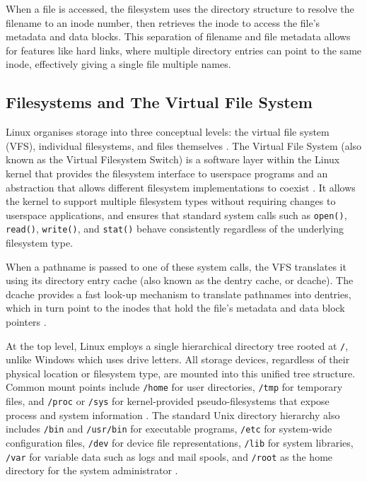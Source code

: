 When a file is accessed, the filesystem uses the directory structure to resolve the filename to an inode number, then retrieves the inode to access the file's metadata and data blocks. This separation of filename and file metadata allows for features like hard links, where multiple directory entries can point to the same inode, effectively giving a single file multiple names.

\subsection{Filesystems and The Virtual File System}
\label{VFS}

Linux organises storage into three conceptual levels: the virtual file system (VFS), individual filesystems, and files themselves \parencite{KernelVFS,GFGOSFileSystems}. The Virtual File System (also known as the Virtual Filesystem Switch) is a software layer within the Linux kernel that provides the filesystem interface to userspace programs and an abstraction that allows different filesystem implementations to coexist \parencite{KernelVFS}. It allows the kernel to support multiple filesystem types without requiring changes to userspace applications, and ensures that standard system calls such as \texttt{open()}, \texttt{read()}, \texttt{write()}, and \texttt{stat()} behave consistently regardless of the underlying filesystem type.

When a pathname is passed to one of these system calls, the VFS translates it using its directory entry cache (also known as the dentry cache, or dcache). The dcache provides a fast look-up mechanism to translate pathnames into dentries, which in turn point to the inodes that hold the file's metadata and data block pointers \parencite{KernelVFS}.

At the top level, Linux employs a single hierarchical directory tree\parencite{GFGUnixFileSystem} rooted at \texttt{/}, unlike Windows which uses drive letters. All storage devices, regardless of their physical location or filesystem type, are mounted into this unified tree structure. Common mount points include \texttt{/home} for user directories, \texttt{/tmp} for temporary files, and \texttt{/proc} or \texttt{/sys} for kernel-provided pseudo-filesystems that expose process and system information \parencite{KernelProc}. The standard Unix directory hierarchy also includes \texttt{/bin} and \texttt{/usr/bin} for executable programs, \texttt{/etc} for system-wide configuration files, \texttt{/dev} for device file representations, \texttt{/lib} for system libraries, \texttt{/var} for variable data such as logs and mail spools, and \texttt{/root} as the home directory for the system administrator \parencite{GFGUnixFileSystem}.

